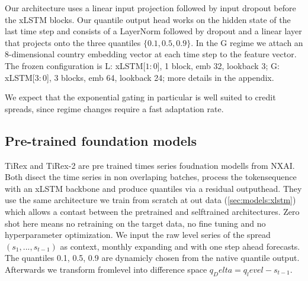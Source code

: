 Our architecture uses a linear input projection followed by input dropout before
the xLSTM blocks. Our quantile output head works on the hidden state of the last
time step and consists of a LayerNorm followed by dropout and a linear layer that
projects onto the three quantiles $\{0.1,0.5,0.9\}$. In the G regime we attach an
8-dimensional country embedding vector at each time step to the feature vector.
The frozen configuration is L: xLSTM[$1{:}0$], 1 block, emb 32, lookback 3; G:
xLSTM[$3{:}0$], 3 blocks, emb 64, lookback 24; more details in the appendix.

We expect that the exponential gating in particular is well suited to credit
spreads, since regime changes require a fast adaptation rate.

\subsection{Pre-trained foundation models}
\label{sec:models:tirex2}


TiRex \parencite{auer2025tirex} and  TiRex-2 \parencite{podest2026tirex2} are pre trained times series foudnation modells from NXAI. Both disect the time series in non overlaping batches, process the tokensequence with an xLSTM backbone \parencite{beck2024xlstm} and produce quantiles via a residual outputhead. They use the same architecture we train from scratch at out data (\cref{sec:models:xlstm}) which allows a contast between the pretrained and selftrained architectures. Zero shot here means no retraining on the target data, no fine tuning and no hyperparameter optimization. We input the raw level series of the spread $(s_1, ..., s_{t-1})$ as context, monthly expanding and with one step ahead forecasts. The quantiles {0.1, 0.5, 0.9} are dynamicly chosen from the native quantile output. Afterwards we transform fromlevel into difference space $q_Delta = q_level - s_{t-1}$.


